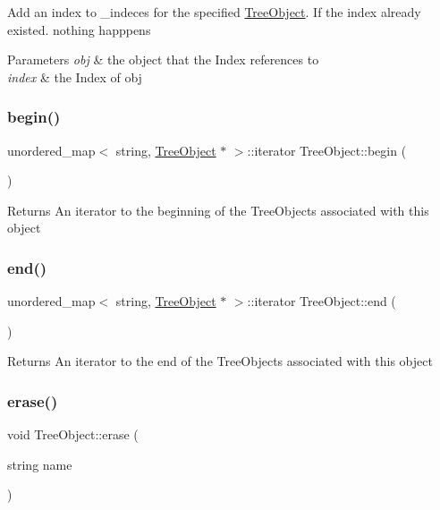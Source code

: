 Add an index to \+\_\+indeces for the specified \mbox{\hyperlink{classTreeObject}{Tree\+Object}}. If the index already existed. nothing happpens 
\begin{DoxyParams}{Parameters}
{\em obj} & the object that the Index references to \\
\hline
{\em index} & the Index of obj \\
\hline
\end{DoxyParams}
\mbox{\label{classTreeObject_af8bb5e54c0a13e1e0e5be409153ab6d8}} 
\subsubsection{\texorpdfstring{begin()}{begin()}}
{\footnotesize\ttfamily unordered\+\_\+map$<$ string, \mbox{\hyperlink{classTreeObject}{Tree\+Object}} $\ast$ $>$\+::iterator Tree\+Object\+::begin (\begin{DoxyParamCaption}{ }\end{DoxyParamCaption})}

\begin{DoxyReturn}{Returns}
An iterator to the beginning of the Tree\+Objects associated with this object 
\end{DoxyReturn}
\mbox{\label{classTreeObject_a2544e2976f3b75cd1f0230f5f908059c}} 
\subsubsection{\texorpdfstring{end()}{end()}}
{\footnotesize\ttfamily unordered\+\_\+map$<$ string, \mbox{\hyperlink{classTreeObject}{Tree\+Object}} $\ast$ $>$\+::iterator Tree\+Object\+::end (\begin{DoxyParamCaption}{ }\end{DoxyParamCaption})}

\begin{DoxyReturn}{Returns}
An iterator to the end of the Tree\+Objects associated with this object 
\end{DoxyReturn}
\mbox{\label{classTreeObject_a453b5df2a9ef7c6faad259900d574ee2}} 
\subsubsection{\texorpdfstring{erase()}{erase()}}
{\footnotesize\ttfamily void Tree\+Object\+::erase (\begin{DoxyParamCaption}\item[{string}]{name }\end{DoxyParamCaption})\hspace{0.3cm}{\ttfamily [virtual]}}


